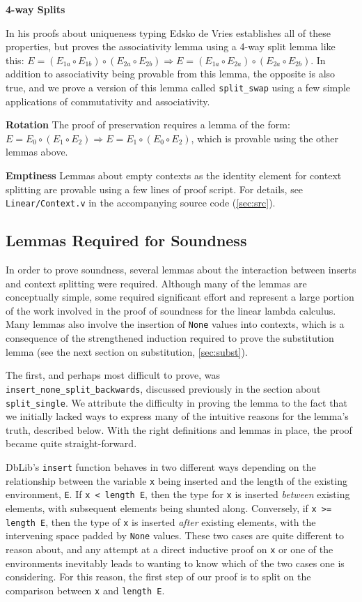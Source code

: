 \documentclass[]{unswthesis}
\let\c\texttt
\let\i\textit
\begin{document}
\textbf{4-way Splits}

In his proofs about uniqueness typing Edsko de Vries \cite{deVries07, deVriesPhD08} establishes all of these properties, but proves the associativity lemma using a 4-way split lemma like this: $E = (E_{1a} \circ E_{1b}) \circ (E_{2a} \circ E_{2b}) \Rightarrow E = (E_{1a} \circ E_{2a}) \circ (E_{2a} \circ E_{2b})$. In addition to associativity being provable from this lemma, the opposite is also true, and we prove a version of this lemma called \c{split_swap} using a few simple applications of commutativity and associativity.

\textbf{Rotation} The proof of preservation requires a lemma of the form: $E = E_0 \circ (E_1 \circ E_2) \Rightarrow E = E_1 \circ (E_0 \circ E_2)$, which is provable using the other lemmas above.

\textbf{Emptiness} Lemmas about empty contexts as the identity element for context splitting are provable using a few lines of proof script. For details, see \c{Linear/Context.v} in the accompanying source code (\cref{sec:src}).

\subsection{Lemmas Required for Soundness}

In order to prove soundness, several lemmas about the interaction between inserts and context splitting were required. Although many of the lemmas are conceptually simple, some required significant effort and represent a large portion of the work involved in the proof of soundness for the linear lambda calculus. Many lemmas also involve the insertion of \c{None} values into contexts, which is a consequence of the strengthened induction required to prove the substitution lemma (see the next section on substitution, \cref{sec:subst}).

The first, and perhaps most difficult to prove, was \c{insert_none_split_backwards}, discussed previously in the section about \c{split_single}. We attribute the difficulty in proving the lemma to the fact that we initially lacked ways to express many of the intuitive reasons for the lemma's truth, described below. With the right definitions and lemmas in place, the proof became quite straight-forward.

DbLib's \c{insert} function behaves in two different ways depending on the relationship between the variable \c{x} being inserted and the length of the existing environment, \c{E}. If \c{x < length E}, then the type for \c{x} is inserted \i{between} existing elements, with subsequent elements being shunted along. Conversely, if \c{x >= length E}, then the type of \c{x} is inserted \i{after} existing elements, with the intervening space padded by \c{None} values. These two cases are quite different to reason about, and any attempt at a direct inductive proof on \c{x} or one of the environments inevitably leads to wanting to know which of the two cases one is considering. For this reason, the first step of our proof is to split on the comparison between \c{x} and \c{length E}.
\end{document}
